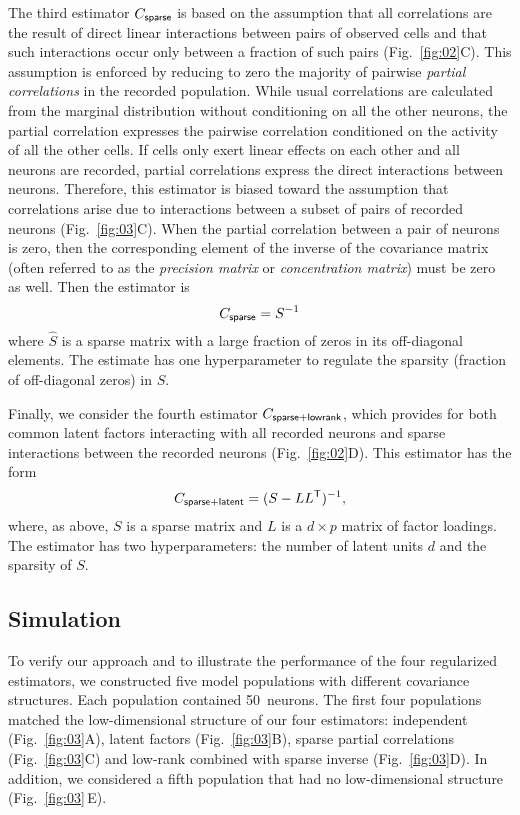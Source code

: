 \documentclass[10pt]{article}
\newcommand{\T}{{\sf T}}
\begin{document}
The third estimator $C_{\sf sparse}$ is based on the assumption that all correlations are the result of direct linear interactions between pairs of observed cells and that such interactions occur only between a fraction of such pairs (Fig.~\ref{fig:02}\;C).
This assumption is enforced by reducing to zero the majority of pairwise \emph{partial correlations} in the recorded population. 
While usual correlations are calculated from the marginal distribution without conditioning on all the other neurons, the partial correlation expresses the pairwise correlation conditioned on the activity of all the other cells.  
If cells only exert linear effects on each other and all neurons are recorded, partial correlations express the direct interactions between neurons. 
Therefore, this estimator is biased toward the assumption that correlations arise due to interactions between a subset of pairs of recorded neurons (Fig.~\ref{fig:03}C). When the partial correlation between a pair of neurons is zero, then the corresponding element of the inverse of the covariance matrix (often referred to as the \emph{precision matrix} or \emph{concentration matrix}) must be zero as well. Then the estimator is 
\begin{equation}
C_{\sf sparse} = S^{-1}
\end{equation}
where $\hat S$ is a sparse matrix with a large fraction of zeros in its off-diagonal elements. The estimate has one hyperparameter to regulate the sparsity (fraction of off-diagonal zeros) in $S$.

Finally, we consider the fourth estimator $C_{\sf sparse+lowrank}$, which provides for both common latent factors interacting with all recorded neurons and sparse interactions between the recorded neurons (Fig.~\ref{fig:02}\;D). This estimator has the form
\begin{equation}
C_{\sf sparse+latent} = (S - LL^\T)^{-1},
\end{equation}
where, as above, $S$ is a sparse matrix and $L$ is a $d\times p$ matrix of factor loadings. The estimator has two hyperparameters: the number of latent units $d$ and the sparsity of $S$.

\subsection*{Simulation}
To verify our approach and to illustrate the performance of the four regularized estimators, we constructed five model populations with different covariance structures. Each population contained 50~neurons. 
The first four populations matched the low-dimensional structure of our four estimators: independent (Fig.~\ref{fig:03}A), latent factors (Fig.~\ref{fig:03}B), sparse partial correlations (Fig.~\ref{fig:03}C) and low-rank combined with sparse inverse (Fig.~\ref{fig:03}D).  
In addition, we considered a fifth population that had no low-dimensional structure (Fig.~\ref{fig:03}\,E).
\end{document}

